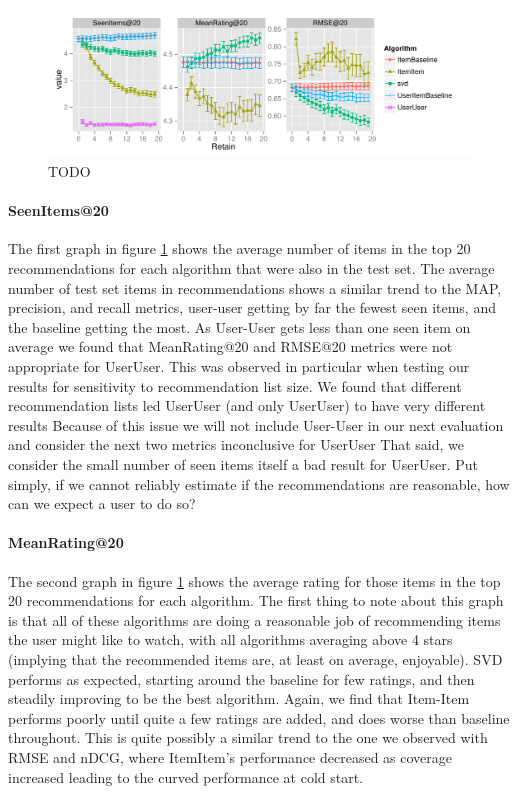 \documentclass[letterpaper]{sig-alternate}
\begin{document}
\begin{figure}[ht!]
  \centering
  \includegraphics[width=1.1\linewidth]{../lenskit/output/ekstrandTuned20/rmse_20.pdf}
  \caption{TODO}
  \label{fig:topN.rmse}
\end{figure}
  \paragraph{SeenItems@20}
  The first graph in figure \ref{fig:topN.rmse} shows the average number of items in the top 20 recommendations for each algorithm that were also in the test set.
  The average number of test set items in recommendations shows a similar trend to the MAP, precision, and recall metrics, user-user getting by far the fewest seen items, and the baseline getting the most.
  As User-User gets less than one seen item on average we found that MeanRating@20 and RMSE@20 metrics were not appropriate for UserUser.
  This was observed in particular when testing our results for sensitivity to recommendation list size.
  We found that different recommendation lists led UserUser (and only UserUser) to have very different results
  Because of this issue we will not include User-User in our next evaluation and consider the next two metrics inconclusive for UserUser
  That said, we consider the small number of seen items itself a bad result for UserUser.
  Put simply, if we cannot reliably estimate if the recommendations are reasonable, how can we expect a user to do so?

  \paragraph{MeanRating@20}
  The second graph in figure \ref{fig:topN.rmse} shows the average rating for those items in the top 20 recommendations for each algorithm.
  The first thing to note about this graph is that all of these algorithms are doing a reasonable job of recommending items the user might like to watch, with all algorithms averaging above 4 stars (implying that the recommended items are, at least on average, enjoyable).
  SVD performs as expected, starting around the baseline for few ratings, and then steadily improving to be the best algorithm.
  Again, we find that Item-Item performs poorly until quite a few ratings are added, and does worse than baseline throughout.
  This is quite possibly a similar trend to the one we observed with RMSE and nDCG, where ItemItem's performance decreased as coverage increased leading to the curved performance at cold start.
    
\end{document}
